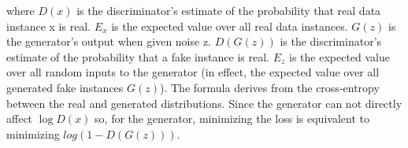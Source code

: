 where $D(x)$ is the discriminator's estimate of the probability that real data instance x is real.
$E_x$ is the expected value over all real data instances. $G(z)$ is the generator's output when given noise z. $D(G(z))$ is the discriminator's estimate of the probability that a fake instance is real.
$E_z$ is the expected value over all random inputs to the generator (in effect, the expected value over all generated fake instances $G(z)$). The formula derives from the cross-entropy between the real and generated distributions. Since the generator can not directly affect $\log{D(x)}$ so, for the generator, minimizing the loss is equivalent to minimizing $log(1 - D(G(z)))$.


\clearpage{\pagestyle{empty}\cleardoublepage}